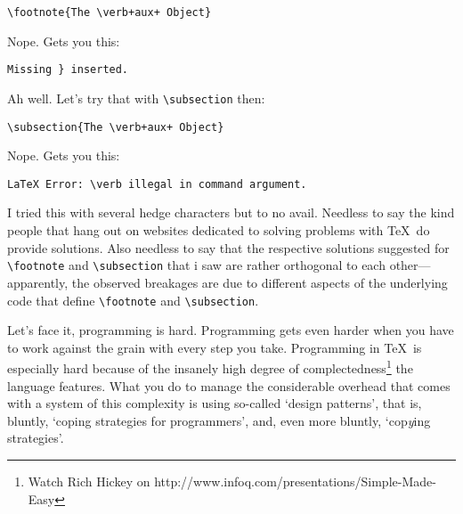 \begin{verbatim}
\footnote{The \verb+aux+ Object}
\end{verbatim}

Nope. Gets you this:

\begin{verbatim}
Missing } inserted.
\end{verbatim}

Ah well. Let's try that with \verb#\subsection# then:

\begin{verbatim}
\subsection{The \verb+aux+ Object}
\end{verbatim}

Nope. Gets you this:

\begin{verbatim}
LaTeX Error: \verb illegal in command argument.
\end{verbatim}

I tried this with several hedge characters but to no avail. Needless to say the kind people that hang out on
websites dedicated to solving problems with \TeX\ do provide solutions. Also needless to say that the
respective solutions suggested for \verb#\footnote# and \verb#\subsection# that i saw are rather orthogonal
to each other---apparently, the observed breakages are due to different aspects of the underlying code that
define \verb#\footnote# and \verb#\subsection#.

Let's face it, programming is hard. Programming gets even harder when you have to work against the grain
with every step you take. Programming in \TeX\ is especially hard because of the insanely high degree of
complectedness\thinspace\footnote{Watch Rich Hickey on http://www.infoq.com/presentations/Simple-Made-Easy}
the language features. What you do to manage the considerable overhead that comes with a system of this
complexity is using so-called `design patterns', that is, bluntly, `coping strategies for programmers',
and, even more bluntly, `cop{\em y}ing strategies'.

